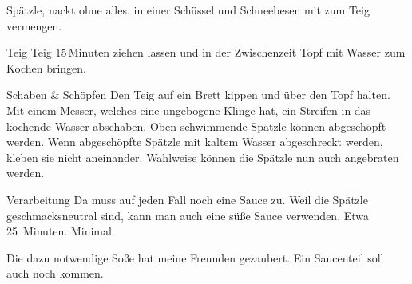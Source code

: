 \begin{recipe}{Spätzle, nackt ohne alles.}
 in einer Schüssel und Schneebesen mit
 zum Teig vermengen.
\item[Teig] Teig 15\,Minuten ziehen lassen und in der Zwischenzeit Topf mit Wasser zum Kochen bringen. 
\item[Schaben \& Schöpfen] Den Teig auf ein Brett kippen und über den Topf halten. Mit einem Messer, welches eine ungebogene Klinge hat, ein Streifen in das kochende Wasser abschaben. Oben schwimmende Spätzle können abgeschöpft werden. 
\hint Wenn abgeschöpfte Spätzle mit kaltem Wasser abgeschreckt werden, kleben sie nicht aneinander.
\hint Wahlweise können die Spätzle nun auch angebraten werden.
\item[Verarbeitung] Da muss auf jeden Fall noch eine Sauce zu. Weil die Spätzle geschmacksneutral sind, kann man auch eine süße Sauce verwenden.
\preparationtime Etwa 25~Minuten.
\washingup Minimal.
\item Die dazu notwendige Soße hat meine Freunden gezaubert. Ein Saucenteil soll auch noch kommen.
\end{recipe}
